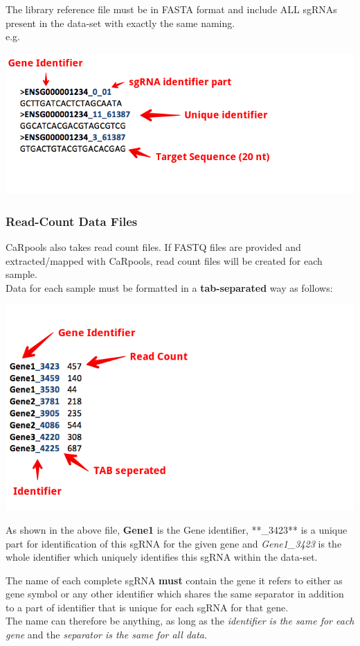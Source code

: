 \documentclass[]{article}
\begin{document}
The library reference file must be in FASTA format and include ALL
sgRNAs present in the data-set with exactly the same naming.\\
e.g.

\includegraphics{./pictures/library-fasta.png}

\subsubsection{Read-Count Data Files}\label{read-count-data-files}

CaRpools also takes read count files. If FASTQ files are provided and
extracted/mapped with CaRpools, read count files will be created for
each sample.\\
Data for each sample must be formatted in a \textbf{tab-separated} way
as follows:

\includegraphics{./pictures/readcount.png}

As shown in the above file, \textbf{Gene1} is the Gene identifier,
**\_3423** is a unique part for identification of this sgRNA for the
given gene and \emph{Gene1\_3423} is the whole identifier which uniquely
identifies this sgRNA within the data-set.

The name of each complete sgRNA \textbf{must} contain the gene it refers
to either as gene symbol or any other identifier which shares the same
separator in addition to a part of identifier that is unique for each
sgRNA for that gene.\\
The name can therefore be anything, as long as the \emph{identifier is
the same for each gene} and the \emph{separator is the same for all
data}.
\end{document}
